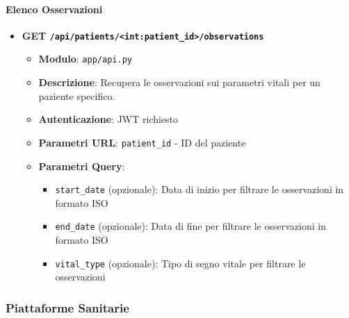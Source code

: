 \documentclass[12pt,a4paper,oneside]{report}
\begin{document}
\paragraph{Elenco Osservazioni}
\begin{itemize}
    \item \textbf{GET \texttt{/api/patients/<int:patient\_id>/observations}}
          \begin{itemize}
              \item \textbf{Modulo}: \texttt{app/api.py}
              \item \textbf{Descrizione}: Recupera le osservazioni sui parametri vitali per un paziente specifico.
              \item \textbf{Autenticazione}: JWT richiesto
              \item \textbf{Parametri URL}: \texttt{patient\_id} - ID del paziente
              \item \textbf{Parametri Query}:
                    \begin{itemize}
                        \item \texttt{start\_date} (opzionale): Data di inizio per filtrare le osservazioni in formato ISO
                        \item \texttt{end\_date} (opzionale): Data di fine per filtrare le osservazioni in formato ISO
                        \item \texttt{vital\_type} (opzionale): Tipo di segno vitale per filtrare le osservazioni
                    \end{itemize}
          \end{itemize}
\end{itemize}

\subsubsection{Piattaforme Sanitarie}
\end{document}
